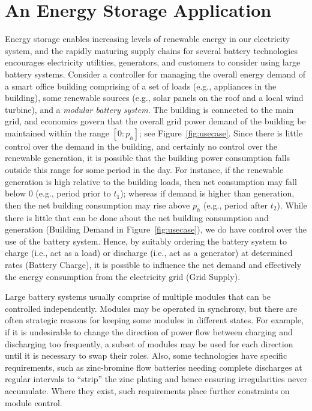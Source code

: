 \section{An Energy Storage Application}\label{sec:application}



Energy storage enables increasing levels of renewable energy in our electricity system, and the rapidly maturing supply chains for several battery technologies encourages electricity utilities, generators, and customers to consider using large battery systems. 
Consider a controller for managing the overall energy demand of a smart office building comprising of a set of loads (e.g., appliances in the building), some renewable sources (e.g., solar panels on the roof and a local wind turbine), and a \emph{modular battery system}. The building is connected to the main grid, and economics govern that the overall grid power demand of the building be maintained within the range $[0:p_h]$; see Figure~\ref{fig:usecase}. 
Since there is little control over the demand in the building, and certainly no control over the renewable generation, it is possible that the building power consumption falls outside this range for some period in the day. For instance, if the renewable generation is high relative to the building loads, then net consumption may fall below $0$ (e.g., period prior to $t_1$); whereas if demand is higher than generation, then the net building consumption may rise above $p_h$ (e.g., period after $t_2$). 
%
While there is little that can be done about the net building consumption and generation (Building Demand in Figure~\ref{fig:usecase}),
we do have control over the use of the battery system. Hence, by suitably ordering the battery system to charge (i.e., act as a load) or discharge (i.e., act as a generator) at determined rates (Battery Charge), it is possible to influence the net demand and effectively the energy consumption from the electricity grid (Grid Supply).

Large battery systems usually comprise of multiple modules that can be controlled independently.  Modules may be operated in synchrony, but there are often strategic reasons for keeping some modules in different states.  For example, if it is undesirable to change the direction of power flow between charging and discharging too frequently, a subset of modules may be used for each direction until it is necessary to swap their roles. Also, some technologies have specific requirements, such as zinc-bromine flow batteries needing complete discharges at regular intervals to ``strip'' the zinc plating and hence ensuring irregularities never accumulate. Where they exist, such requirements place further constraints on module control.

